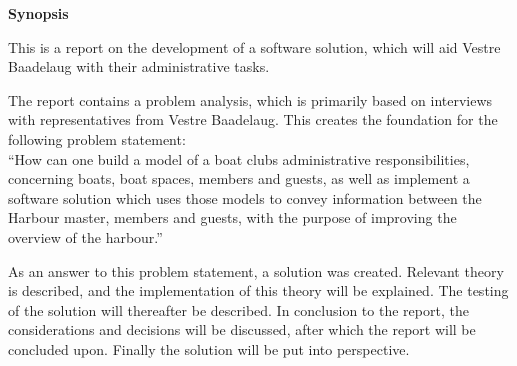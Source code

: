 \begin{center}\textbf{Synopsis}\\ \end{center}

This is a report on the development of a software solution, which will aid Vestre Baadelaug with their administrative tasks.

The report contains a problem analysis, which is primarily based on interviews with representatives from Vestre Baadelaug. This creates the foundation for the following problem statement:\\

\enquote{How can one build a model of a boat clubs administrative responsibilities, concerning boats, boat spaces, members and guests, as well as implement a software solution which uses those models to convey information between the Harbour master, members and guests, with the purpose of improving the overview of the harbour.}

As an answer to this problem statement, a solution was created. Relevant theory is described, and the implementation of this theory will be explained. The testing of the solution will thereafter be described.
In conclusion to the report, the considerations and decisions will be discussed, after which the report will be concluded upon. Finally the solution will be put into perspective.

